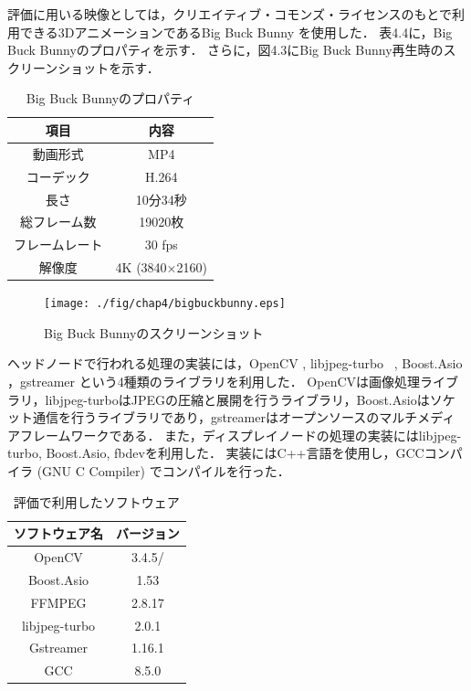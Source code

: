 評価に用いる映像としては，クリエイティブ・コモンズ・ライセンスのもとで利用できる3DアニメーションであるBig Buck Bunny \cite{bigbackbunny}を使用した．
表4.4に，Big Buck Bunnyのプロパティを示す．
さらに，図4.3にBig Buck Bunny再生時のスクリーンショットを示す．

\begin{table}[H]
    \caption{Big Buck Bunnyのプロパティ}
    \begin{center}
    \begin{tabular}{cc}
    \hline
    項目 & 内容 \\\hline\hline
    動画形式　& MP4 \\ \hline
    コーデック & H.264 \cite{h264} \\ \hline
    長さ & 10分34秒 \\ \hline
    総フレーム数 & 19020枚 \\ \hline
    フレームレート & 30 fps \\ \hline
    解像度 & 4K (3840×2160) \\ \hline

    \end{tabular}
    \end{center}
\end{table}

\begin{figure}[H]
    \hspace*{\fill}
    \texttt{[image: ./fig/chap4/bigbuckbunny.eps]}
    \hspace*{\fill}
    \caption{Big Buck Bunnyのスクリーンショット}
   \end{figure}

ヘッドノードで行われる処理の実装には，OpenCV \cite{opencv}, libjpeg-turbo ~\cite{libjpeg}, Boost.Asio \cite{asio}，gstreamer \cite{gstreamer} という4種類のライブラリを利用した． 
OpenCVは画像処理ライブラリ，libjpeg-turboはJPEGの圧縮と展開を行うライブラリ，Boost.Asioはソケット通信を行うライブラリであり，gstreamerはオープンソースのマルチメディアフレームワークである．
また，ディスプレイノードの処理の実装にはlibjpeg-turbo, Boost.Asio, fbdevを利用した．
実装にはC++言語を使用し，GCCコンパイラ (GNU C Compiler) \cite{gcc}でコンパイルを行った．


\begin{table}[H]
    \caption{評価で利用したソフトウェア}
    \begin{center}
    \begin{tabular}{cc}
    \hline
    ソフトウェア名 & バージョン \\\hline\hline
    OpenCV & 3.4.5/ \\ \hline
    Boost.Asio \cite{h264} & 1.53  \\ \hline
    FFMPEG & 2.8.17 \\ \hline
    libjpeg-turbo & 2.0.1 \\ \hline
    Gstreamer & 1.16.1 \\ \hline
    GCC & 8.5.0 \\ \hline

    \end{tabular}
    \end{center}
\end{table}


